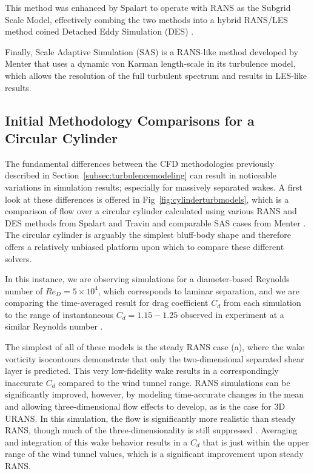 \documentclass[journal]{new-aiaa}
\begin{document}
This method was enhanced by Spalart to operate with RANS as the Subgrid Scale Model, effectively combing the two methods into a hybrid RANS/LES method coined Detached Eddy Simulation (DES) \cite{spalart2009detachededdy}.

Finally, Scale Adaptive Simulation (SAS) is a RANS-like method developed by Menter \cite{menter2005scaleadaptive} that uses a dynamic von Karman length-scale in its turbulence model, which allows the resolution of the full turbulent spectrum and results in LES-like results.











\subsection{Initial Methodology Comparisons for a Circular Cylinder} \label{subsec:initialcompare}

The fundamental differences between the CFD methodologies previously described in Section~\ref{subsec:turbulencemodeling} can result in noticeable variations in simulation results; especially for massively separated wakes. A first look at these differences is offered in Fig~\ref{fig:cylinderturbmodels}, which is a comparison of flow over a circular cylinder calculated using various RANS and DES methods from Spalart and Travin \cite{spalart2009detachededdy} and comparable SAS cases from Menter \cite{menter2005scaleadaptive}. The circular cylinder is arguably the simplest bluff-body shape and therefore offers a relatively unbiased platform upon which to compare these different solvers.

In this instance, we are observing simulations for a diameter-based Reynolds number of $Re_D = 5 \times 10^4$, which corresponds to laminar separation, and we are comparing the time-averaged result for drag coefficient $C_d$ from each simulation to the range of instantaneous $C_d=1.15-1.25$ observed in experiment at a similar Reynolds number \cite{travin2000detachededdy}.

The simplest of all of these models is the steady RANS case (a), where the wake vorticity isocontours demonstrate that only the two-dimensional separated shear layer is predicted. This very low-fidelity wake results in a correspondingly inaccurate $C_d$ compared to the wind tunnel range. RANS simulations can be significantly improved, however, by modeling time-accurate changes in the mean and allowing three-dimensional flow effects to develop, as is the case for 3D URANS.  In this simulation, the flow is significantly more realistic than steady RANS, though much of the three-dimensionality is still suppressed \cite{spalart2009detachededdy}.  Averaging and integration of this wake behavior results in a $C_d$ that is just within the upper range of the wind tunnel values, which is a significant improvement upon steady RANS.
\end{document}
